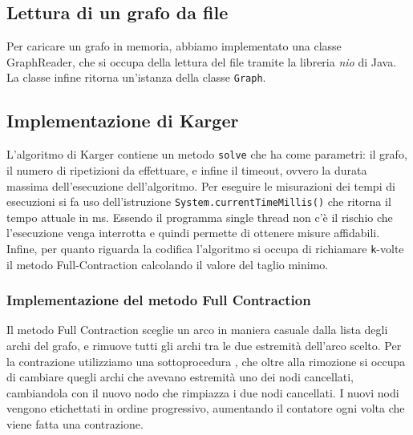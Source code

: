 \subsection{Lettura di un grafo da file}
Per caricare un grafo in memoria, abbiamo implementato una classe GraphReader,
che si occupa della lettura del file tramite la libreria \textit{nio} di Java.
La classe infine ritorna un'istanza della classe \texttt{Graph}.
\subsection{Implementazione di Karger}
L'algoritmo di Karger contiene un metodo \texttt{solve} che ha come parametri: il grafo,
il numero di ripetizioni da effettuare, e infine il timeout, ovvero la durata massima
dell'esecuzione dell'algoritmo.
Per eseguire le misurazioni dei tempi di esecuzioni si fa uso dell'istruzione
\texttt{System.currentTimeMillis()} che ritorna il tempo attuale in ms.
Essendo il programma single thread non c'è il rischio che l'esecuzione venga interrotta e
quindi permette di ottenere misure affidabili.
Infine, per quanto riguarda la codifica l'algoritmo si occupa di richiamare \texttt{k}-volte
il metodo Full-Contraction calcolando il valore del taglio minimo.
\subsubsection{Implementazione del metodo Full Contraction}
Il metodo Full Contraction sceglie un arco in maniera casuale dalla lista degli archi del grafo, e rimuove
tutti gli archi tra le due estremità dell'arco scelto. Per la contrazione utilizziamo una sottoprocedura ,
che oltre alla rimozione si occupa di cambiare quegli archi che avevano estremità uno dei nodi cancellati, cambiandola
con il nuovo nodo che rimpiazza i due nodi cancellati. I nuovi nodi vengono etichettati in ordine progressivo,
aumentando il contatore ogni volta che viene fatta una contrazione.
